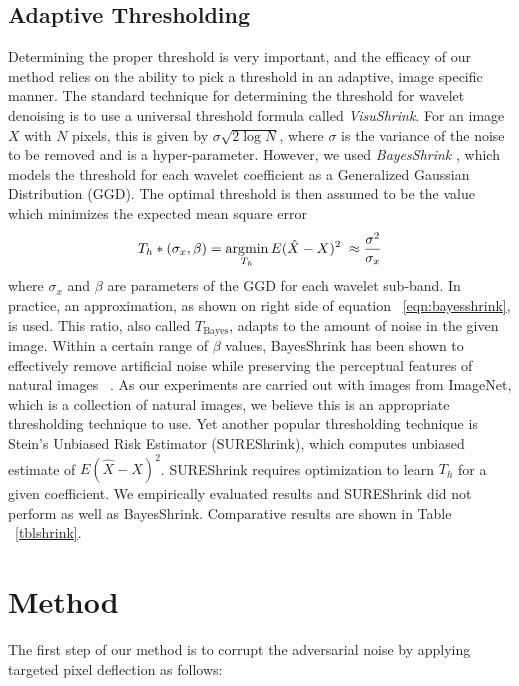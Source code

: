 \subsection{Adaptive Thresholding \label{sec:contentthresholding}}
Determining the proper threshold is very important, and the efficacy of our method relies on the ability to pick a threshold in an adaptive, image specific manner.
The standard technique for determining the threshold for wavelet denoising is to use a universal threshold formula called \textit{VisuShrink}. 
For an image $X$ with $N$ pixels, this is given by $\sigma\sqrt{2\log N}$, where $\sigma$ is the variance of the noise to be removed and is a hyper-parameter. 
However, we used \textit{BayesShrink} \cite{BayesShrinkChang2000}, which models the threshold for each wavelet coefficient as a Generalized Gaussian Distribution (GGD). 
The optimal threshold is then assumed to be the value which minimizes the expected mean square error \ie
\begin{equation}
T_h*(\sigma_x, \beta) = \operatorname*{\arg\!\min}_{T_h} E(\hat{X} - X)^2 \; \approx \frac{\sigma^2}{\sigma_x}
\label{eqn:bayesshrink}
\end{equation}
where $\sigma_x$ and $\beta$ are parameters of the GGD for each wavelet sub-band.
In practice, an approximation, as shown on right side of equation ~\ref{eqn:bayesshrink}, is used. 
This ratio, also called $T_{\text{Bayes}}$, adapts to the amount of noise in the given image.
Within a certain range of $\beta$ values, BayesShrink has been shown to effectively remove artificial noise while preserving the perceptual features of natural images ~\cite{BayesShrinkChang2000,WaveletDenoisingRangarajan2002}.
As our experiments are carried out with images from ImageNet, which is a collection of natural images, we believe this is an appropriate thresholding technique to use.
Yet another popular thresholding technique is Stein's Unbiased Risk Estimator (SUREShrink), which computes unbiased estimate of $E(\hat{X} - X)^2 $. SUREShrink requires optimization to learn $T_h$ for a given coefficient. We empirically evaluated results and SUREShrink did not perform as well as BayesShrink. Comparative results are  shown in Table ~\ref{tblshrink}.

\section{Method}

The first step of our method is to corrupt the adversarial noise by applying targeted pixel deflection as follows: 

